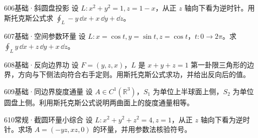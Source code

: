 \begin{exercise}{606}{基础·斜圆盘投影}
设 $L:x^2+y^2=1,z=1-x$，从正 $z$ 轴向下看为逆时针。用斯托克斯公式求 $\oint_L-y\,\dd x+x\,\dd y+\dd z$。
\end{exercise}
\begin{exercise}{607}{基础·空间参数环量}
设 $L:x=\cos t,y=\sin t,z=\cos t$，$t:0\to2\pi$。求 $\oint_Ly\,\dd x+z\,\dd y+x\,\dd z$。
\end{exercise}
\begin{exercise}{608}{基础·反向边界功}
设 $F=(y,z,x)$，$L$ 是 $x+y+z=1$ 第一卦限三角形的边界，方向与下侧法向符合右手定则。用斯托克斯公式求功，并给出反向后的值。
\end{exercise}
\begin{exercise}{609}{基础·同边界旋度通量}
设 $A\in C^1(\mathbb R^3)$，$S_1$ 为单位上半球面上侧，$S_2$ 为单位圆盘上侧。利用斯托克斯公式说明两曲面上的旋度通量相等。
\end{exercise}
\begin{exercise}{610}{常规·截圆环量小综合}
设 $L:x^2+y^2+z^2=4,z=1$，从正 $z$ 轴向下看为逆时针。求场 $A=(-yz,xz,0)$ 的环量，并用参数法核验符号。
\end{exercise}
